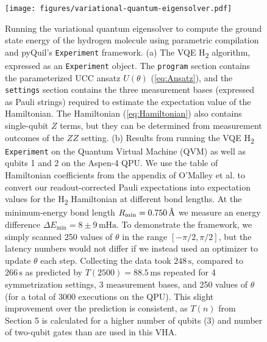 \documentclass[12pt]{iopart}
\begin{document}
\begin{figure}
    \centering
    \texttt{[image: figures/variational-quantum-eigensolver.pdf]}
    \caption{
    Running the variational quantum eigensolver to compute the ground state energy of the hydrogen molecule using parametric compilation and pyQuil's \texttt{Experiment} framework. (a) The VQE H\textsubscript{2} algorithm, expressed as an \texttt{Experiment} object. The \texttt{program} section contains the parameterized UCC ansatz $U(\theta)$ (\cref{eq:Ansatz}), and the \texttt{settings} section contains the three measurement bases (expressed as Pauli strings) required to estimate the expectation value of the Hamiltonian. The Hamiltonian (\cref{eq:Hamiltonian}) also contains single-qubit $Z$ terms, but they can be determined from measurement outcomes of the $ZZ$ setting. (b) Results from running the VQE H\textsubscript{2} \texttt{Experiment} on the Quantum Virtual Machine (QVM) \cite{RigettiQVM} as well as qubits 1 and 2 on the Aspen-4 QPU. We use the table of Hamiltonian coefficients from the appendix of O'Malley et al. to convert our readout-corrected Pauli expectations into expectation values for the H\textsubscript{2} Hamiltonian at different bond lengths. At the minimum-energy bond length $R_{\textrm{min}} = 0.750\,\textup{\AA}$ we measure an energy difference $\Delta E_{\textrm{min}} = 8 \pm 9\,\mathrm{mHa}$. To demonstrate the framework, we simply scanned 250 values of $\theta$ in the range $[-\pi/2, \pi/2]$, but the latency numbers would not differ if we instead used an optimizer to update $\theta$ each step. Collecting the data took $248\,\textrm{s}$, compared to $266\,\textrm{s}$ as predicted by $T(2500) = 88.5\,\textrm{ms}$ repeated for 4 symmetrization settings, 3 measurement bases, and 250 values of $\theta$ (for a total of 3000 executions on the QPU). This slight improvement over the prediction is consistent, as $T(n)$ from Section 5 is calculated for a higher number of qubits (3) and number of two-qubit gates than are used in this VHA.}
    \label{fig:VQE}
\end{figure}
\end{document}
